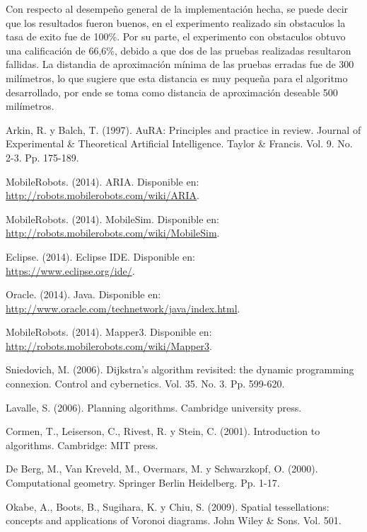 \documentclass[11pt,twoside,A5]{article}
\newcommand{\link}[1]{{\footnotesize\url{#1}}}
\begin{document}
Con respecto al desempeño general de la implementación hecha, se puede decir que los resultados 
fueron buenos, en el experimento realizado sin obstaculos la tasa de exito fue de 100\%.
Por su parte, el experimento con obstaculos obtuvo una calificación de 66,6\%, debido a que dos
de las pruebas realizadas resultaron fallidas. La distandia de aproximación mínima de las pruebas erradas
fue de 300 milímetros, lo que sugiere que esta distancia es muy pequeña para el algoritmo desarrollado, por ende se toma como
distancia de aproximación deseable 500 milímetros.

\begin{thebibliography}{999}

	Arkin, R. y Balch, T. (1997).
 	AuRA: Principles and practice in review.
	Journal of Experimental \& Theoretical Artificial Intelligence.
	Taylor \& Francis. Vol. 9. No. 2-3. Pp. 175-189.
	
	MobileRobots. (2014).
	ARIA. 	
	Disponible en: \\\link{http://robots.mobilerobots.com/wiki/ARIA}.
	
	MobileRobots. (2014).
	MobileSim. 	
	Disponible en: \\\link{http://robots.mobilerobots.com/wiki/MobileSim}.
	
	Eclipse. (2014).
	Eclipse IDE. 	
	Disponible en: \\\link{https://www.eclipse.org/ide/}.

	Oracle. (2014).
	Java. 	
	Disponible en: \\\link{http://www.oracle.com/technetwork/java/index.html}.
	
	MobileRobots. (2014).
	Mapper3. 	
	Disponible en: \\\link{http://robots.mobilerobots.com/wiki/Mapper3}.
	
	Sniedovich, M. (2006). 
	Dijkstra's algorithm revisited: the dynamic programming connexion. 
	Control and cybernetics.
	Vol. 35. No. 3. Pp. 599-620.

	Lavalle, S. (2006). Planning algorithms. Cambridge university press.
	
	Cormen, T., Leiserson, C., Rivest, R. y Stein, C. (2001). Introduction to algorithms. Cambridge: MIT press.

	De Berg, M., Van Kreveld, M., Overmars, M. y Schwarzkopf, O. (2000). Computational geometry. Springer Berlin Heidelberg.
	Pp. 1-17.

	Okabe, A., Boots, B., Sugihara, K. y Chiu, S. (2009). Spatial tessellations: concepts and applications of Voronoi diagrams. John Wiley & Sons. Vol. 501.
	
\end{thebibliography}
\end{document}

